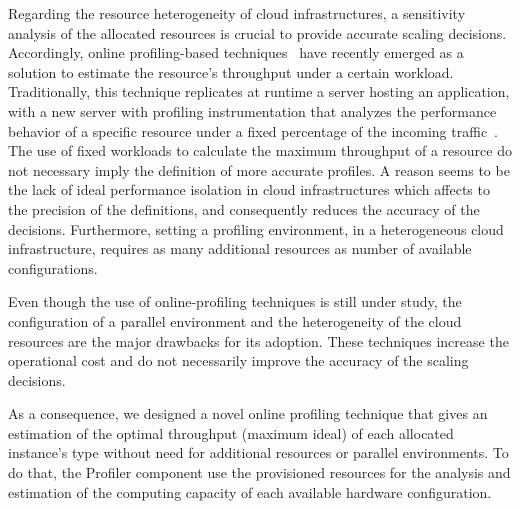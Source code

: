 Regarding the resource heterogeneity of cloud infrastructures, a sensitivity analysis of the allocated resources is crucial to provide accurate scaling decisions. Accordingly, online profiling-based techniques~\cite{kaviani_profiling-as--service:_2011} have recently emerged as a solution to  estimate the resource's throughput under a certain workload. Traditionally, this technique replicates at runtime a server hosting an application, with a new server with profiling instrumentation that analyzes the performance behavior of a specific resource under a fixed percentage of the incoming traffic~\cite{jiangThesis,dejavu2012}. The use of fixed workloads to calculate the maximum throughput of a resource do not necessary imply the definition of more accurate profiles. A reason seems to be the lack of ideal performance isolation in cloud infrastructures which affects to the precision of the definitions, and consequently reduces the accuracy of the decisions. Furthermore, setting a profiling environment, in a heterogeneous cloud infrastructure, requires as many additional resources as number of available configurations. 

Even though the use of online-profiling techniques is still under study, the configuration of a parallel environment and the heterogeneity of the cloud resources are the major drawbacks for its adoption. These techniques increase the operational cost and do not necessarily improve the accuracy of the scaling decisions.


As a consequence, we designed a novel online profiling technique that gives an estimation of the optimal throughput (maximum ideal) of each allocated instance's type without need for additional resources or parallel environments. To do that, the Profiler component use the provisioned resources for the analysis and estimation of the computing capacity of each available hardware configuration.

